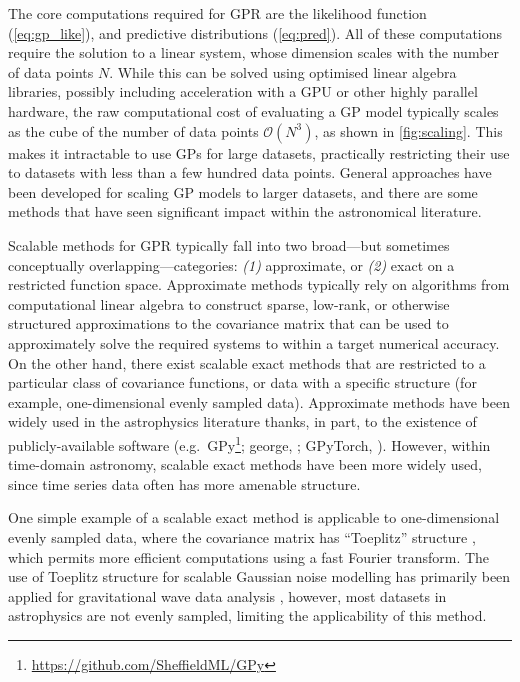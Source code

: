 \documentclass[letterpaper]{ar-1col}
\newcommand{\project}[1]{\textsf{#1}}
\begin{document}
The core computations required for GPR are the likelihood function (\autoref{eq:gp_like}), and predictive distributions (\autoref{eq:pred}).
All of these computations require the solution to a linear system, whose dimension scales with the number of data points $N$.
While this can be solved using optimised linear algebra libraries, possibly including acceleration with a GPU or other highly parallel hardware, the raw computational cost of evaluating a GP model typically scales as the cube of the number of data points $\mathcal{O}(N^3)$, as shown in \autoref{fig:scaling}.
This makes it intractable to use GPs for large datasets, practically restricting their use to datasets with less than a few hundred data points.
General approaches have been developed for scaling GP models to larger datasets, and there are some methods that have seen significant impact within the astronomical literature.

Scalable methods for GPR typically fall into two broad---but sometimes conceptually overlapping---categories: \emph{(1)} approximate, or \emph{(2)} exact on a restricted function space.
Approximate methods typically rely on algorithms from computational linear algebra to construct sparse, low-rank, or otherwise structured approximations to the covariance matrix that can be used to approximately solve the required systems to within a target numerical accuracy.
On the other hand, there exist scalable exact methods that are restricted to a particular class of covariance functions, or data with a specific structure (for example, one-dimensional evenly sampled data).
Approximate methods \citep[e.g.,][]{inducing, george, kissgp, 2015arXiv151101870W} have been widely used in the astrophysics literature thanks, in part, to the existence of publicly-available software (e.g.\ \project{GPy}\footnote{\url{https://github.com/SheffieldML/GPy}}; \project{george}, \citealt{george}; \project{GPyTorch}, \citealt{gpytorch}).
However, within time-domain astronomy, scalable exact methods have been more widely used, since time series data often has more amenable structure.

One simple example of a scalable exact method is applicable to one-dimensional evenly sampled data, where the covariance matrix has ``Toeplitz'' structure \citep[e.g.,][]{toeplitz}, which permits more efficient computations using a fast Fourier transform.
The use of Toeplitz structure for scalable Gaussian noise modelling has primarily been applied for gravitational wave data analysis \citep[e.g.,][]{2020PhRvR...2d3298T, 2021arXiv210705609I}, however, most datasets in astrophysics are not evenly sampled, limiting the applicability of this method.
\end{document}
